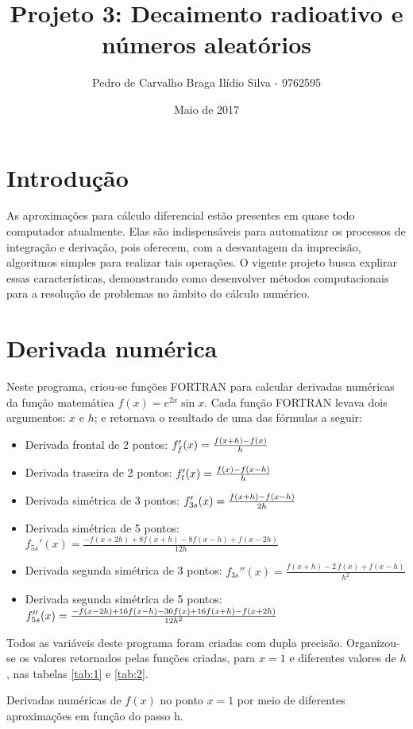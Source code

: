\documentclass{article}
\title{Projeto 3: Decaimento radioativo e números aleatórios}
\author{Pedro de Carvalho Braga Ilídio Silva - 9762595}
\date{Maio de 2017}
\begin{document}
\maketitle

\section{Introdução}
As aproximações para cálculo diferencial estão presentes em quase todo computador atualmente. Elas são indispensáveis para automatizar os processos de integração e derivação, pois oferecem, com a desvantagem da imprecisão, algoritmos simples para realizar tais operações. O vigente projeto busca explirar essas características, demonstrando como desenvolver métodos computacionais para a resolução de problemas no âmbito do cálculo numérico.

\section{Derivada numérica}

Neste programa, criou-se  funções FORTRAN para calcular derivadas numéricas da função matemática $f(x)=e^{2x}\sin{x}$. Cada função FORTRAN levava dois argumentos: $x$ e $h$; e retornava o resultado de uma das fórmulas a seguir:

\begin{itemize}
\item Derivada frontal de 2 pontos: \(f_f'(x)={f(x+h)-f(x) \over h}\)
\item Derivada traseira de 2 pontos: \(f_t'(x)={f(x)-f(x-h) \over h}\)
\item Derivada simétrica de 3 pontos: \(f_{3s}'(x)={f(x+h)-f(x-h) \over 2h}\)
\item Derivada simétrica de 5 pontos: \(f_{5s}'(x)={\frac {-f(x+2h)+8f(x+h)-8f(x-h)+f(x-2h)}{12h}}\)
\item Derivada segunda simétrica de 3 pontos: \(f_{3s}''(x)=\frac{f(x+h)-2\,f(x)+f(x-h)}{h^2}\)
\item Derivada segunda simétrica de 5 pontos: \(f_{5s}''(x) ={ -f (x - 2h) + 16f (x - h) - 30f (x) + 16f (x + h) - f (x + 2h)\over 12h^2}\)
\end{itemize}

Todos as variáveis deste programa foram criadas com dupla precisão.
Organizou-se os valores retornados pelas funções criadas, para $x = 1$ e diferentes valores de $h$, nas tabelas \ref{tab:1} e \ref{tab:2}.

\begin{table}[h]
  \centering
  
  \caption{Derivadas numéricas de $f(x)$ no ponto $x = 1$ por meio de diferentes aproximações em função do passo h.}
  \label{tab:1}
\end{table}
\end{document}
